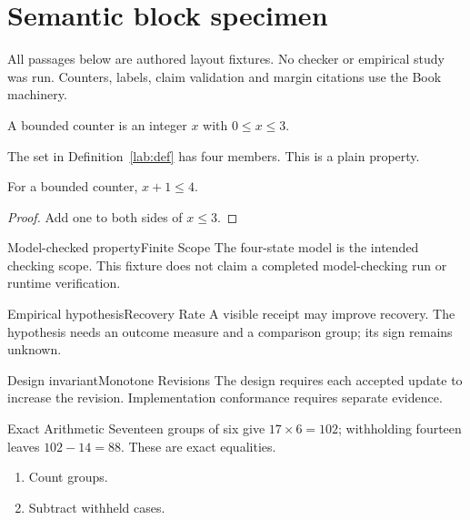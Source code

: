 \documentclass[11pt,twoside]{article}
\begin{document}
\pagestyle{plain}
\makeatletter
\ifdefined\pdblockglyph
  \let\labpicturehandler\pgfsys@typesetpicturebox
  \newsavebox{\labglyphbox}
  \ifdim\wd\labglyphbox>20pt\PackageError{block-fixture}{Inline glyph too wide}{}\fi
  \ifx\labpicturehandler\pgfsys@typesetpicturebox\else
    \PackageError{block-fixture}{Global picture handler changed}{}\fi
\fi
\makeatother
\section{Semantic block specimen}
All passages below are authored layout fixtures. No checker or empirical study
was run. Counters, labels, claim validation and margin citations use the Book machinery.
\begin{definition}\label{lab:def}
A bounded counter is an integer $x$ with $0\leq x\leq 3$.
\end{definition}
\begin{property}[Range]\label{lab:prop}
The set in Definition~\ref{lab:def} has four members. This is a plain property.
\end{property}
\begin{theorem}\label{lab:thm}
For a bounded counter, $x+1\leq4$.
\end{theorem}
\begin{proof}Add one to both sides of $x\leq3$.\end{proof}
\begin{pdclaim}{Model-checked property}{Finite Scope}\label{lab:checked}
The four-state model is the intended checking scope. This fixture does not
claim a completed model-checking run or runtime verification.
\end{pdclaim}
\begin{pdclaim}{Empirical hypothesis}{Recovery Rate}\label{lab:hyp}
A visible receipt may improve recovery. The hypothesis needs an outcome measure
and a comparison group; its sign remains unknown.
\end{pdclaim}
\begin{pdclaim}{Design invariant}{Monotone Revisions}\label{lab:inv}
The design requires each accepted update to increase the revision.
Implementation conformance requires separate evidence.
\end{pdclaim}
\begin{pdexample}{Exact Arithmetic}\label{lab:arithmetic}
Seventeen groups of six give $17\times6=102$; withholding fourteen leaves
$102-14=88$. These are exact equalities.
\begin{enumerate}\item Count groups.\item Subtract withheld cases.\end{enumerate}
\end{pdexample}
\clearpage
\end{document}

